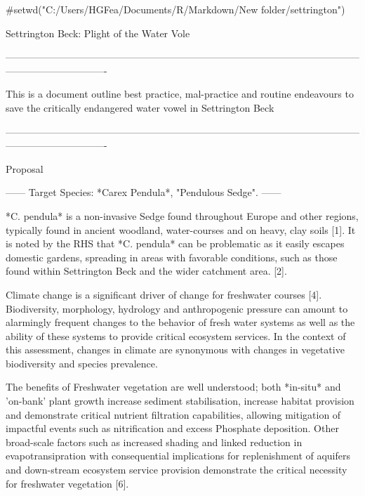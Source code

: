 
#setwd("C:/Users/HGFea/Documents/R/Markdown/New folder/settrington")

\begin{center}

\Huge{Settrington Beck: Plight of the Water Vole}

\end{center}

-------------------------------------------------------------------------------------------------------------------------------------------

This is a document outline best practice, mal-practice and routine endeavours to save the critically endangered water vowel in Settrington Beck


-------------------------------------------------------------------------------------------------------------------------------------------

\begin{center}

 Proposal

\end{center}

------
Target Species: *Carex Pendula*, "Pendulous Sedge". 
------

*C. pendula* is a non-invasive Sedge found throughout Europe and other regions, typically found in ancient woodland, water-courses and on heavy, clay soils [1]. It is noted by the RHS that *C. pendula* can be problematic as it easily escapes domestic gardens, spreading in areas with favorable conditions, such as those found within Settrington Beck and the wider catchment area. [2].




Climate change is a significant driver of change for freshwater courses [4]. Biodiversity, morphology, hydrology and  anthropogenic pressure can amount to alarmingly frequent changes to the behavior of fresh water systems as well as the ability of these systems to provide critical ecosystem services. In the context of this assessment, changes in climate are synonymous with changes in vegetative biodiversity and species prevalence. 

The benefits of Freshwater vegetation are well understood;  both *in-situ* and 'on-bank' plant growth increase sediment stabilisation, increase habitat provision and demonstrate critical nutrient filtration capabilities, allowing mitigation of impactful events such as nitrification and excess Phosphate deposition. Other broad-scale factors such as increased shading and linked reduction in evapotransipration with consequential implications for replenishment of aquifers and down-stream ecosystem service provision demonstrate the critical necessity for freshwater vegetation [6].


